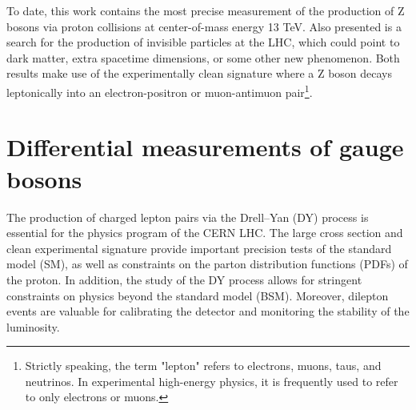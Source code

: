 To date, this work contains the most precise measurement of the production of Z bosons via proton collisions at center-of-mass energy 13 TeV.
Also presented is a search for the production of invisible particles at the LHC, which could
point to dark matter, extra spacetime dimensions, or some other new phenomenon.
Both results make use of the experimentally clean signature where a Z boson decays leptonically into an electron-positron or muon-antimuon pair\footnote{Strictly speaking, the term "lepton" refers to electrons, muons, taus, and neutrinos. In experimental high-energy physics, it is frequently used to refer to only electrons or muons.}.

\section{Differential measurements of gauge bosons}
The production of charged lepton pairs via the Drell--Yan (DY) process 
is essential for the physics program of the CERN LHC.  
The large cross section and clean experimental signature %
provide important precision
tests of the standard model (SM),
as well as constraints on the 
parton distribution functions (PDFs) of the proton. In addition, the study of 
the DY process allows for stringent constraints on physics beyond the standard 
model (BSM).
Moreover, dilepton events are valuable for calibrating the 
detector and monitoring the stability of the luminosity.

